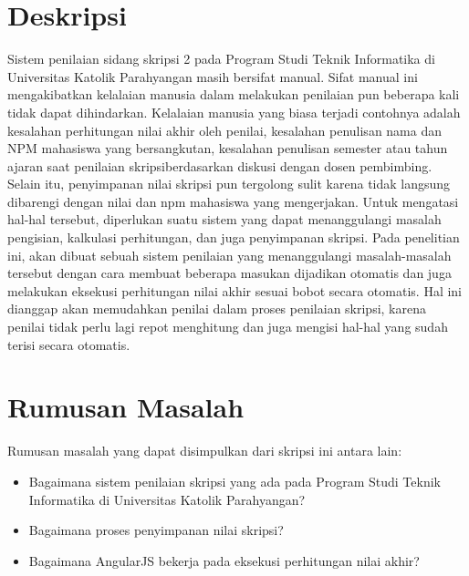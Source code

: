 \documentclass[a4paper,twoside]{article}
\begin{document}
\title{\@judultopik}
\author{\nama \textendash \@npm} 

\newcommand{\nama}{Billy Yanuar}
\newcommand{\@npm}{2012730017}
\newcommand{\@judultopik}{Sistem Penilaian Sidang Skripsi 2 dengan AngularJS} %
\newcommand{\jumpemb}{1} %
\newcommand{\tanggal}{11/02/2016}
\maketitle


\section{Deskripsi}
Sistem penilaian sidang skripsi 2 pada Program Studi Teknik Informatika di Universitas Katolik Parahyangan masih bersifat manual. Sifat manual ini mengakibatkan kelalaian manusia dalam melakukan penilaian pun beberapa kali tidak dapat dihindarkan. Kelalaian manusia yang biasa terjadi contohnya adalah kesalahan perhitungan nilai akhir oleh penilai, kesalahan penulisan nama dan NPM mahasiswa yang bersangkutan, kesalahan penulisan semester atau tahun ajaran saat penilaian skripsi{\footnotesize berdasarkan diskusi dengan dosen pembimbing}. Selain itu, penyimpanan nilai skripsi pun tergolong sulit karena tidak langsung dibarengi dengan nilai dan npm mahasiswa yang mengerjakan. Untuk mengatasi hal-hal tersebut, diperlukan suatu sistem yang dapat menanggulangi masalah pengisian, kalkulasi perhitungan, dan juga penyimpanan skripsi.
Pada penelitian ini, akan dibuat sebuah sistem penilaian yang menanggulangi masalah-masalah tersebut dengan cara membuat beberapa masukan dijadikan otomatis dan juga melakukan eksekusi perhitungan nilai akhir sesuai bobot secara otomatis. Hal ini dianggap akan memudahkan penilai dalam proses penilaian skripsi, karena penilai tidak perlu lagi repot menghitung dan juga mengisi hal-hal yang sudah terisi secara otomatis.


\section{Rumusan Masalah}
Rumusan masalah yang dapat disimpulkan dari skripsi ini antara lain:
\begin{itemize}
	\item Bagaimana sistem penilaian skripsi yang ada pada Program Studi Teknik Informatika di Universitas Katolik Parahyangan?
	\item Bagaimana proses penyimpanan nilai skripsi?
	\item Bagaimana AngularJS bekerja pada eksekusi perhitungan nilai akhir?
\end{itemize}
\end{document}
